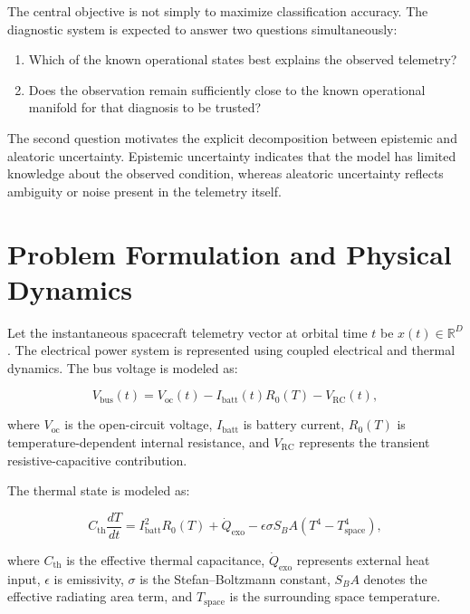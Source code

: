 \documentclass[conference]{IEEEtran}
\begin{document}
The central objective is not simply to maximize classification accuracy. The diagnostic system is expected to answer two questions simultaneously:
\begin{enumerate}
    \item Which of the known operational states best explains the observed telemetry?
    \item Does the observation remain sufficiently close to the known operational manifold for that diagnosis to be trusted?
\end{enumerate}

The second question motivates the explicit decomposition between epistemic and aleatoric uncertainty. Epistemic uncertainty indicates that the model has limited knowledge about the observed condition, whereas aleatoric uncertainty reflects ambiguity or noise present in the telemetry itself.

\section{Problem Formulation and Physical Dynamics}

Let the instantaneous spacecraft telemetry vector at orbital time $t$ be $x(t)\in\mathbb{R}^{D}$. The electrical power system is represented using coupled electrical and thermal dynamics. The bus voltage is modeled as:

\begin{equation}
V_{\mathrm{bus}}(t) = V_{\mathrm{oc}}(t) - I_{\mathrm{batt}}(t)R_0(T) - V_{\mathrm{RC}}(t),
\label{eq:vbus}
\end{equation}

where $V_{\mathrm{oc}}$ is the open-circuit voltage, $I_{\mathrm{batt}}$ is battery current, $R_0(T)$ is temperature-dependent internal resistance, and $V_{\mathrm{RC}}$ represents the transient resistive-capacitive contribution.

The thermal state is modeled as:

\begin{equation}
C_{\mathrm{th}}\frac{dT}{dt} = I_{\mathrm{batt}}^2R_0(T) + \dot{Q}_{\mathrm{exo}} - \epsilon\sigma S_B A \left(T^4-T_{\mathrm{space}}^4\right),
\label{eq:thermal}
\end{equation}

where $C_{\mathrm{th}}$ is the effective thermal capacitance, $\dot{Q}_{\mathrm{exo}}$ represents external heat input, $\epsilon$ is emissivity, $\sigma$ is the Stefan--Boltzmann constant, $S_BA$ denotes the effective radiating area term, and $T_{\mathrm{space}}$ is the surrounding space temperature.
\end{document}
